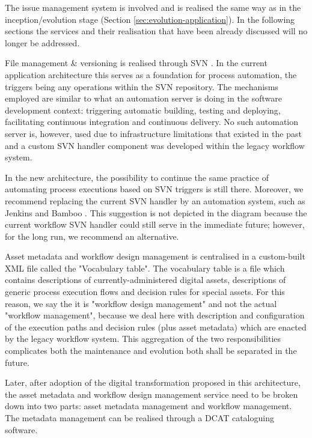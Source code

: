 	The issue management system is involved and is realised the same way as in the inception/evolution stage (Section \ref{sec:evolution-application}). In the following sections the services and their realisation that have been already discussed will no longer be addressed.  
	
	File management \& versioning is realised through SVN \cite{svn}. In the current application architecture this serves as a foundation for process automation, the triggers being any operations within the SVN repository. The mechanisms employed are similar to what an automation server is doing in the software development context: triggering automatic building, testing and deploying, facilitating continuous integration and continuous delivery. No such automation server is, however, used due to infrastructure limitations that existed in the past and a custom SVN handler component was developed within the legacy workflow system. 
	
	In the new architecture, the possibility to continue the same practice of automating process executions based on SVN triggers is still there. Moreover, we recommend replacing the current SVN handler by an automation system, such as Jenkins \citep{jenkins} and Bamboo \cite{bamboo}. This suggestion is not depicted in the diagram because the current workflow SVN handler could still serve in the immediate future; however, for the long run, we recommend an alternative.
	
	Asset metadata and workflow design management is centralised in a custom-built XML file called the "Vocabulary table". The vocabulary table is a file which contains descriptions of currently-administered digital assets, descriptions of generic process execution flows and decision rules for special assets. For this reason, we say the it is "workflow design management" and not the actual "workflow management",  because we deal here with description and configuration of the execution paths and decision rules (plus asset metadata) which are enacted by the legacy workflow system. This aggregation of the two responsibilities complicates both the maintenance and evolution both shall be separated in the future.  
	
	Later, after adoption of the digital transformation proposed in this architecture, the asset metadata and workflow design management service need to be broken down into two parts: asset metadata management and workflow management. The metadata management can be realised through a DCAT \citep{dcat2} cataloguing software. 
	

